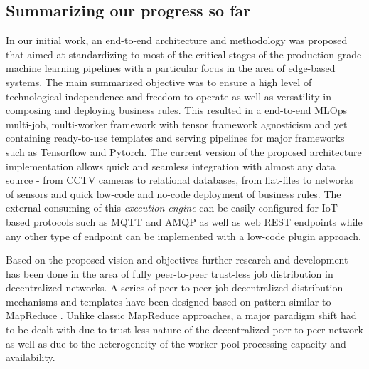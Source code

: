 \documentclass{article}
\begin{document}
\subsection{Summarizing our progress so far}
In our initial work\cite{ciobanu2021solis}, an end-to-end architecture and methodology was proposed that aimed at standardizing to most of the critical stages of the production-grade machine learning pipelines with a particular focus in the area of edge-based systems. The main summarized objective was to ensure a high level of technological independence and freedom to operate as well as versatility in composing and deploying business rules. This resulted in a end-to-end MLOps multi-job, multi-worker framework with tensor framework agnosticism and yet containing ready-to-use templates and serving pipelines for major frameworks such as Tensorflow\cite{abadi2016tensorflow} and Pytorch\cite{paszke2019pytorch}. The current version of the proposed architecture implementation allows quick and seamless integration with almost any data source - from CCTV cameras to relational databases, from flat-files to networks of sensors and  quick low-code and no-code deployment of business rules. The external consuming of this \emph{execution engine} can be easily configured for IoT based protocols such as MQTT\cite{hunkeler2008mqtt}\cite{mqtt} and AMQP\cite{amqp} as well as web REST endpoints while any other type of endpoint can be implemented with a low-code plugin approach.

Based on the proposed vision and objectives further research and development has been done in the area of fully peer-to-peer trust-less job distribution in decentralized networks. A series of peer-to-peer job decentralized distribution mechanisms and templates have been designed based on pattern similar to MapReduce \cite{dean2008mapreduce}. Unlike classic MapReduce approaches, a major paradigm shift had to be dealt with due to trust-less nature of the decentralized peer-to-peer network as well as due to the heterogeneity of the worker pool processing capacity and availability.
\end{document}
